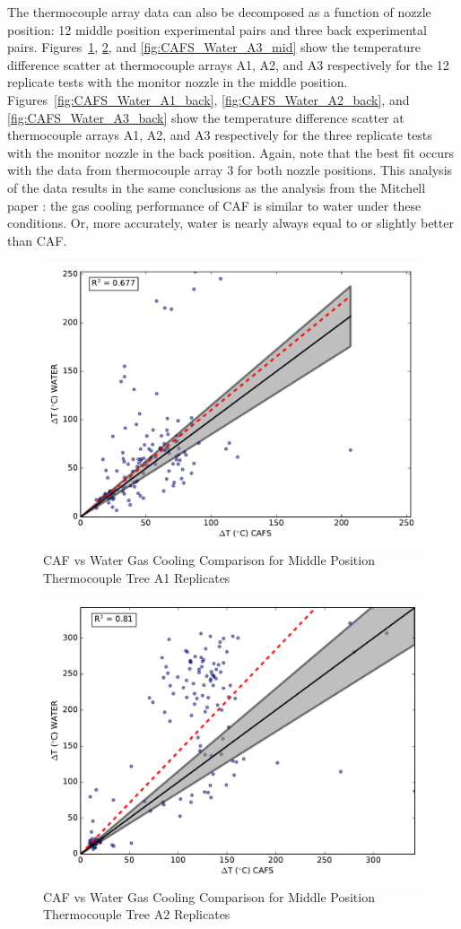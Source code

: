 \documentclass[12pt,oneside]{book}
\begin{document}
\clearpage

The thermocouple array data can also be decomposed as a function of nozzle position: 12 middle position experimental pairs and three back experimental pairs. Figures~\ref{fig:CAFS_Water_A1_mid}, \ref{fig:CAFS_Water_A2_mid}, and \ref{fig:CAFS_Water_A3_mid} show the temperature difference scatter at thermocouple arrays A1, A2, and A3 respectively for the 12 replicate tests with the monitor nozzle in the middle position. Figures~\ref{fig:CAFS_Water_A1_back}, \ref{fig:CAFS_Water_A2_back}, and \ref{fig:CAFS_Water_A3_back} show the temperature difference scatter at thermocouple arrays A1, A2, and A3 respectively for the three replicate tests with the monitor nozzle in the back position. Again, note that the best fit occurs with the data from thermocouple array 3 for both nozzle positions. This analysis of the data results in the same conclusions as the analysis from the Mitchell paper \cite{Mitchell:1}: the gas cooling performance of CAF is similar to water under these conditions. Or, more accurately, water is nearly always equal to or slightly better than CAF.

\begin{figure}[!ht]
	\includegraphics[width=.7\columnwidth]{../Figures/Gas_Cooling/Combined_mid_A1_scatter}
	\caption{CAF vs Water Gas Cooling Comparison for Middle Position Thermocouple Tree A1 Replicates}
	\label{fig:CAFS_Water_A1_mid}
\end{figure}

\begin{figure}[!ht]
	\includegraphics[width=.7\columnwidth]{../Figures/Gas_Cooling/Combined_mid_A2_scatter}
	\caption{CAF vs Water Gas Cooling Comparison for Middle Position Thermocouple Tree A2 Replicates}
	\label{fig:CAFS_Water_A2_mid}
\end{figure}
\end{document}
